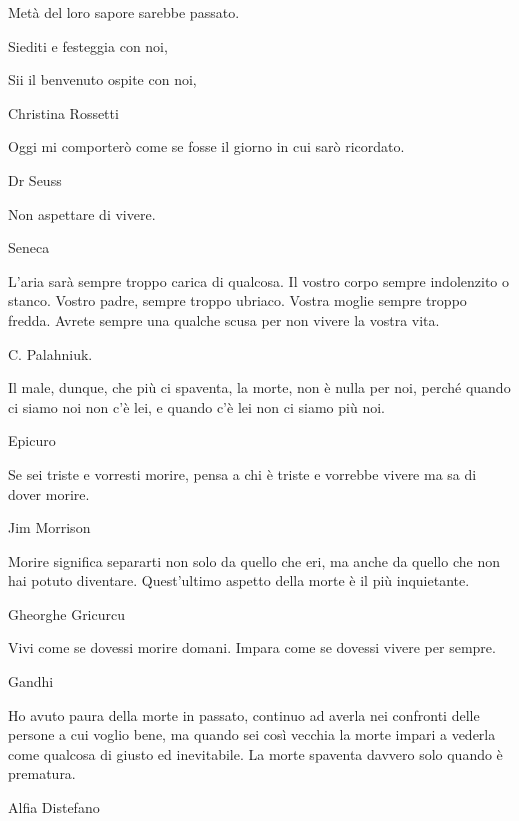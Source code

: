 \documentclass[12pt]{book} %
\begin{document}
\begin{mdframed}[linewidth=1pt]
Metà del loro sapore sarebbe passato. 

Siediti e festeggia con noi, 

Sii il benvenuto ospite con noi, 

Christina Rossetti


\bigskip

Oggi mi comporterò come se fosse il giorno in cui sarò ricordato.

Dr Seuss

\bigskip

Non aspettare di vivere.

Seneca


\bigskip

L'aria sarà sempre troppo carica di qualcosa. Il vostro corpo sempre indolenzito o stanco. Vostro
padre, sempre troppo ubriaco. Vostra moglie sempre troppo fredda. Avrete sempre una qualche scusa per non vivere la
vostra vita.

C. Palahniuk.


\bigskip

Il male, dunque, che più ci spaventa, la morte, non è nulla per noi, perché quando ci siamo noi non c'è lei, e quando
c'è lei non ci siamo più noi. 

Epicuro

\bigskip

Se sei triste e vorresti morire, pensa a chi è triste e vorrebbe vivere ma sa di dover morire.

Jim Morrison

\bigskip

Morire significa separarti non solo da quello che eri, ma anche da quello che non hai potuto diventare. Quest’ultimo aspetto della morte è il più inquietante.

Gheorghe Gricurcu

\bigskip

Vivi come se dovessi morire domani. Impara come se dovessi vivere per sempre.

Gandhi

\bigskip

Ho avuto paura della morte in passato, continuo ad averla nei confronti delle persone a cui voglio bene, ma quando sei così vecchia la morte impari a vederla come qualcosa di giusto ed inevitabile. La morte spaventa davvero solo quando è prematura. 

Alfia Distefano
\end{mdframed}
\end{document}
